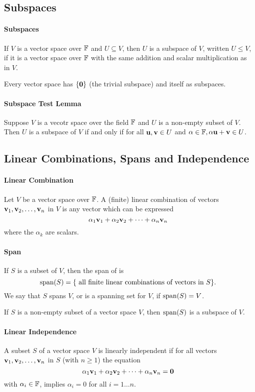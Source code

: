 \subsection{Subspaces}
\paragraph{Subspaces} 
If \(V\) is a vector space over \(\mathbb{F}\) and \(U \subseteq V\), then \(U\) is a subspace of \(V\), written \(U \leq V\), if it is a vector space over \(\mathbb{F}\) with the same addition and scalar multiplication as in \(V\).

Every vector space has \(\{\mathbf{0}\}\) (the trivial subspace) and itself as subspaces.

\paragraph{Subspace Test Lemma}
Suppose \(V\) is a vecotr space over the field \(\mathbb{F}\) and \(U\) is a non-empty subset of \(V\). Then \(U\) is a subspace of \(V\) if and only if for all \(\mathbf{u}, \mathbf{v} \in U\) and \(\alpha \in \mathbb{F}, \alpha\mathbf{u} + \mathbf{v} \in U\).

\subsection{Linear Combinations, Spans and Independence}
\paragraph{Linear Combination}
Let \(V\) be a vector space over \(\mathbb{F}\). A (finite) linear combination of vectors \(\mathbf{v}_1, \mathbf{v}_2, \dots, \mathbf{v}_n\) in \(V\) is any vector which can be expressed 
\[\alpha_1\mathbf{v}_1 + \alpha_2\mathbf{v}_2 + \cdots + \alpha_n\mathbf{v}_n\]
where the \(\alpha_k\) are scalars.

\paragraph{Span} 
If \(S\) is a subset of \(V\), then the span of is
\[\mathrm{span}(S) = \{ \text{ all finite linear combinations of vectors in } S \}.\]
We say that \(S\) spans \(V\), or is a spanning set for \(V\), if \(\mathrm{span}(S) = V\).

If \(S\) is a non-empty subset of a vector space \(V\), then \(\mathrm{span}(S)\) is a subspace of \(V\).

\paragraph{Linear Independence}
A subset \(S\) of a vector space \(V\) is linearly independent if for all vectors \(\mathbf{v}_1, \mathbf{v}_2, \dots, \mathbf{v}_n\) in \(S\) (with \(n \geq 1\)) the equation
\[\alpha_1\mathbf{v}_1 + \alpha_2\mathbf{v}_2 + \cdots + \alpha_n\mathbf{v}_n = \mathbf{0}\]
with \(\alpha_i \in \mathbb{F}\), implies \(\alpha_i = 0\) for all \(i = 1 \dots n\).

